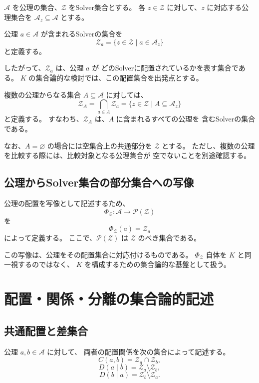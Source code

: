 \documentclass[a4paper,12pt]{article}
\begin{document}
$\mathcal{A}$ を公理の集合、$\mathcal{Z}$ をSolver集合とする。
各 $z\in\mathcal{Z}$ に対して、$z$ に対応する公理集合を
$\mathcal{A}_z\subseteq\mathcal{A}$ とする。

公理 $a\in\mathcal{A}$ が含まれるSolverの集合を
\[
    \mathcal{Z}_a
    =
    \{z\in\mathcal{Z}\mid a\in\mathcal{A}_z\}
\]
と定義する。

したがって、$\mathcal{Z}_a$ は、公理 $a$ が
どのSolverに配置されているかを表す集合である。
$K$ の集合論的な検討では、この配置集合を出発点とする。

複数の公理からなる集合 $A\subseteq\mathcal{A}$ に対しては、
\[
    \mathcal{Z}_A
    =
    \bigcap_{a\in A}\mathcal{Z}_a
    =
    \{z\in\mathcal{Z}\mid A\subseteq\mathcal{A}_z\}
\]
と定義する。
すなわち、$\mathcal{Z}_A$ は、$A$ に含まれるすべての公理を
含むSolverの集合である。

なお、$A=\varnothing$ の場合には空集合上の共通部分を
$\mathcal{Z}$ とする。
ただし、複数の公理を比較する際には、比較対象となる公理集合が
空でないことを別途確認する。

\subsection{公理からSolver集合の部分集合への写像}

公理の配置を写像として記述するため、
\[
    \Phi_{\mathcal{Z}}:
    \mathcal{A}\longrightarrow\mathcal{P}(\mathcal{Z})
\]
を
\[
    \Phi_{\mathcal{Z}}(a)=\mathcal{Z}_a
\]
によって定義する。
ここで、$\mathcal{P}(\mathcal{Z})$ は
$\mathcal{Z}$ のべき集合である。

この写像は、公理をその配置集合に対応付けるものである。
$\Phi_{\mathcal{Z}}$ 自体を $K$ と同一視するのではなく、
$K$ を構成するための集合論的な基盤として扱う。

\section{配置・関係・分離の集合論的記述}

\subsection{共通配置と差集合}

公理 $a,b\in\mathcal{A}$ に対して、
両者の配置関係を次の集合によって記述する。
\[
    C(a,b)=\mathcal{Z}_a\cap\mathcal{Z}_b,
\]
\[
    D(a\mid b)=\mathcal{Z}_a\setminus\mathcal{Z}_b,
\]
\[
    D(b\mid a)=\mathcal{Z}_b\setminus\mathcal{Z}_a.
\]
\end{document}
